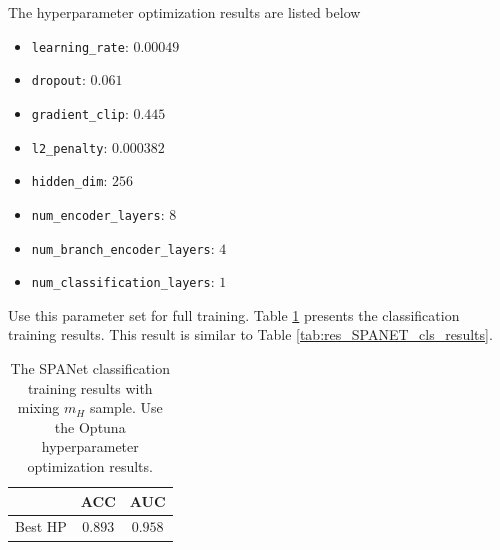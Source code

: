 \documentclass[12pt]{article}
\begin{document}
		The hyperparameter optimization results are listed below
		\begin{itemize}
			\item \verb+learning_rate+: $0.00049$ 
			\item \verb+dropout+: $0.061$ 
			\item \verb+gradient_clip+: $0.445$ 
			\item \verb+l2_penalty+: $0.000382$ 
			\item \verb+hidden_dim+: $256$ 
			\item \verb+num_encoder_layers+: $8$ 
			\item \verb+num_branch_encoder_layers+: $4$ 
			\item \verb+num_classification_layers+: $1$ 
		\end{itemize}

		Use this parameter set for full training. Table \ref{tab:SPANET_best_hp_cls_results} presents the classification training results. This result is similar to Table \ref{tab:res_SPANET_cls_results}.
	\begin{table}[htpb]
		\centering
		\caption{The SPANet classification training results with mixing $m_H$ sample. Use the Optuna hyperparameter optimization results.}
		\label{tab:SPANET_best_hp_cls_results}
		\begin{tabular}{c|cc}
		& ACC     & AUC   \\ \hline
		Best HP & $0.893 $ & $0.958 $
		\end{tabular}      
	\end{table}

\end{document}
